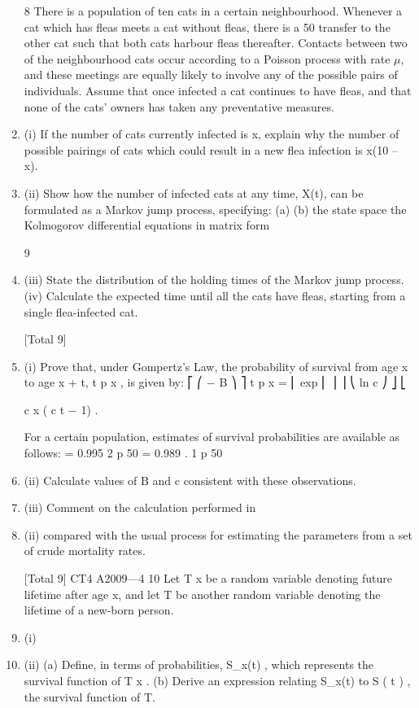 \documentclass[a4paper,12pt]{article}
\begin{document}
\begin{enumerate}


8
There is a population of ten cats in a certain neighbourhood. Whenever a cat which has fleas meets a cat without fleas, there is a 50%
transfer to the other cat such that both cats harbour fleas thereafter. Contacts between two of the neighbourhood cats occur according to a Poisson process with rate $\mu$, and these meetings are equally likely to involve any of the possible pairs of individuals.
Assume that once infected a cat continues to have fleas, and that none of the cats’ owners has taken any preventative measures.
\item (i) If the number of cats currently infected is x, explain why the number of possible pairings of cats which could result in a new flea infection is x(10 – x).

\item (ii) Show how the number of infected cats at any time, X(t), can be formulated as
a Markov jump process, specifying:
(a)
(b)
the state space
the Kolmogorov differential equations in matrix form

9
\item (iii) State the distribution of the holding times of the Markov jump process.
(iv) Calculate the expected time until all the cats have fleas, starting from a single
flea-infected cat.

[Total 9]



\item (i) Prove that, under Gompertz’s Law, the probability of survival from age x to
age x + t, t p x , is given by:
⎡
⎛ − B ⎞ ⎤
t p x = ⎢ exp ⎜
⎟ ⎥
⎝ ln c ⎠ ⎦
⎣

c x ( c t − 1)
.

For a certain population, estimates of survival probabilities are available as follows:
= 0.995
2 p 50 = 0.989 .
1 p 50
\item (ii) Calculate values of B and c consistent with these observations.
\item (iii) Comment on the calculation performed in \item (ii) compared with the usual process
for estimating the parameters from a set of crude mortality rates.

[Total 9]
CT4 A2009—4
10
Let T x be a random variable denoting future lifetime after age x, and let T be
another random variable denoting the lifetime of a new-born person.
\item (i)
\item (ii)
(a) Define, in terms of probabilities, S_x(t) , which represents the survival
function of T x .
(b) Derive an expression relating S_x(t) to S ( t ) , the survival function of T.


\end{enumerate}
\end{document}
